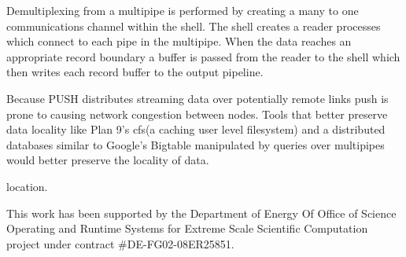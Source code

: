 \documentclass[11pt, letterpaper]{article}
\begin{document}
Demultiplexing from a multipipe is performed by creating a many to one communications channel within the shell. The shell creates a reader processes which connect to each pipe in the multipipe. When the data reaches an appropriate record boundary a buffer is passed from the reader to the shell which then writes each record buffer to the output pipeline. 

Because PUSH distributes streaming data over potentially remote links push 
is prone to causing network congestion between nodes. Tools that better 
preserve data locality like Plan 9's cfs(a caching user level filesystem) 
and a distributed databases similar to Google's Bigtable\cite{chang2006bds} 
manipulated by queries over multipipes would better preserve the locality of data. 

location.

This work has been supported by the Department of Energy Of Office of Science Operating and Runtime Systems for Extreme Scale Scientific Computation project under contract \#DE-FG02-08ER25851. 



\end{document}
